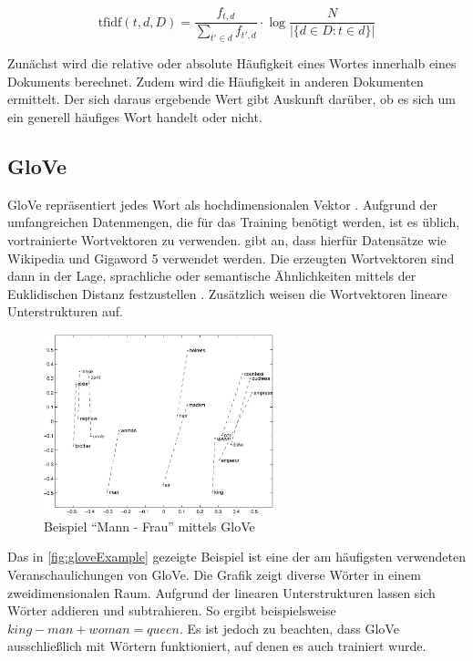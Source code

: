 \[\mathrm{tfidf}(t,d,D) = \frac{f_{t,d}}{{\sum_{t' \in d}{f_{t',d}}}} \cdot \log \frac{N}{|\{d \in D: t \in d\}|}\]

Zunächst wird die relative oder absolute Häufigkeit eines Wortes innerhalb eines Dokuments berechnet. Zudem wird die Häufigkeit in anderen Dokumenten ermittelt. Der sich daraus ergebende Wert gibt Auskunft darüber, ob es sich um ein generell häufiges Wort handelt oder nicht.

\subsection*{GloVe}

\ac{GloVe} repräsentiert jedes Wort als hochdimensionalen Vektor \autocite[8\psq]{kowsari_text_2019}. Aufgrund der umfangreichen Datenmengen, die für das Training benötigt werden, ist es üblich, vortrainierte Wortvektoren zu verwenden. \citeauthor{kowsari_text_2019} gibt an, dass hierfür Datensätze wie Wikipedia und Gigaword \num{5} verwendet werden. Die erzeugten Wortvektoren sind dann in der Lage, sprachliche oder semantische Ähnlichkeiten mittels der Euklidischen Distanz festzustellen \autocite{pennington_glove_2014}. Zusätzlich weisen die Wortvektoren lineare Unterstrukturen auf.

\begin{figure}[H]
  \centering
  \includegraphics[width=0.6\textwidth]{data/images/materials_and_methods/man_woman.jpg}
  \caption{Beispiel \enquote{Mann - Frau} mittels \acs{GloVe} \autocite{pennington_glove_2014}} \label{fig:gloveExample}
\end{figure}

Das in \autoref{fig:gloveExample} gezeigte Beispiel ist eine der am häufigsten verwendeten Veranschaulichungen von \ac{GloVe}. Die Grafik zeigt diverse Wörter in einem zweidimensionalen Raum. Aufgrund der linearen Unterstrukturen lassen sich Wörter addieren und subtrahieren. So ergibt beispielsweise \(king - man + woman = queen\). Es ist jedoch zu beachten, dass \ac{GloVe} ausschließlich mit Wörtern funktioniert, auf denen es auch trainiert wurde.

